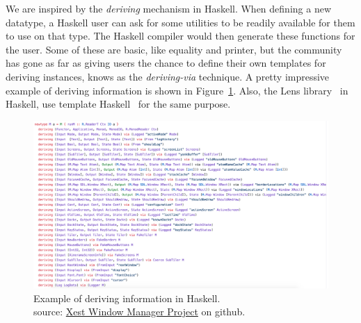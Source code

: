 We are inspired by the \emph{deriving} mechanism in Haskell. When defining a new datatype, a Haskell user can ask for some utilities to be readily available for them to use on that type. The Haskell compiler would then generate these functions for the user. Some of these are basic, like equality and printer, but the community has gone as far as giving users the chance to define their own templates for deriving instances, knows as the \emph{deriving-via} technique. A pretty impressive example of deriving information is shown in Figure~\ref{fig:deriving-via-example}. 
Also, the Lens library~\cite{lensesLib} in Haskell, use template Haskell~\cite{sheard2002TH} for the same purpose. 
\begin{figure}
    \includegraphics[scale=0.5,width=\linewidth]{figures/deriving-via-example.png}
    \caption{Example of deriving information in Haskell. \\ source: \href{https://github.com/jhgarner/Xest-Window-Manager/blob/3741b35a69eb2cf8cd7320e186fd40134d1c1a56/src/Base/DoAll.hs}{Xest Window Manager Project} on github.}
    \label{fig:deriving-via-example}
\end{figure}


